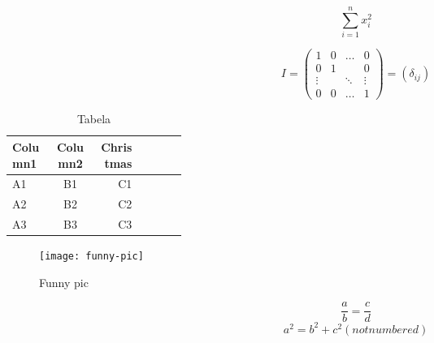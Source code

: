 \documentclass[a4paper]{article}
\begin{document}
\[
\sum_{i=1}^n x_i^2
\]

\[
I =
\left(
\begin{array}{cccc}
1 & 0 & \ldots & 0 \\
0 & 1 & & 0 \\
\vdots & & \ddots & \vdots \\
0 & 0 & \ldots & 1
\end{array}
\right)
= \left(\delta_{ij}\right)
\]

\begin{table*}
\begin{center}
\begin{tabular}{|l|c|r| p{0.25\linewidth} |}
\hline
Column1 & Column2 & Christmas \\
\hline
A1 & B1 & C1 \\
\hline
A2 & B2 & C2 \\
\hline
A3 & B3 & C3 \\
\hline
\end{tabular}
\end{center}
\caption{Tabela}
\label{tab:tabela-letras}
\end{table*}

\begin{figure}
\texttt{[image: funny-pic]}\caption{Funny pic}
\end{figure}

\begin{equation}
\frac{a}{b} = \frac{c}{d}
\end{equation}
\begin{displaymath}
	a^2 = b^2 + c^2 (not numbered)
\end{displaymath}
\end{document}
